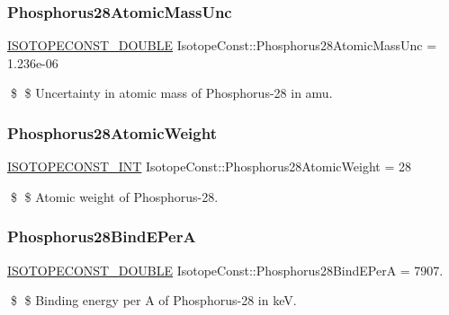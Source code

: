 \subsubsection{\texorpdfstring{Phosphorus28\+Atomic\+Mass\+Unc}{Phosphorus28AtomicMassUnc}}
{\footnotesize\ttfamily \mbox{\hyperlink{group___isotope_const-_macros_ga8f45a7272ce02c0b4c65c44636ed719a}{I\+S\+O\+T\+O\+P\+E\+C\+O\+N\+S\+T\+\_\+\+D\+O\+U\+B\+LE}} Isotope\+Const\+::\+Phosphorus28\+Atomic\+Mass\+Unc = 1.\+236e-\/06}

\$ \$ Uncertainty in atomic mass of Phosphorus-\/28 in amu. \mbox{\label{group___isotope_const-_phosphorus-_p28_gae78f6ccdcce4c6ffbbd527d632b072a0}} 
\subsubsection{\texorpdfstring{Phosphorus28\+Atomic\+Weight}{Phosphorus28AtomicWeight}}
{\footnotesize\ttfamily \mbox{\hyperlink{group___isotope_const-_macros_ga5f18360b3e99483a35c32d789e62621c}{I\+S\+O\+T\+O\+P\+E\+C\+O\+N\+S\+T\+\_\+\+I\+NT}} Isotope\+Const\+::\+Phosphorus28\+Atomic\+Weight = 28}

\$ \$ Atomic weight of Phosphorus-\/28. \mbox{\label{group___isotope_const-_phosphorus-_p28_ga7eefbe77aaf1103191488c9cee63364b}} 
\subsubsection{\texorpdfstring{Phosphorus28\+Bind\+E\+PerA}{Phosphorus28BindEPerA}}
{\footnotesize\ttfamily \mbox{\hyperlink{group___isotope_const-_macros_ga8f45a7272ce02c0b4c65c44636ed719a}{I\+S\+O\+T\+O\+P\+E\+C\+O\+N\+S\+T\+\_\+\+D\+O\+U\+B\+LE}} Isotope\+Const\+::\+Phosphorus28\+Bind\+E\+PerA = 7907.}

\$ \$ Binding energy per A of Phosphorus-\/28 in keV. \mbox{\label{group___isotope_const-_phosphorus-_p28_ga784ced2512e8c373f0346a7c1dbbbbe7}} 
